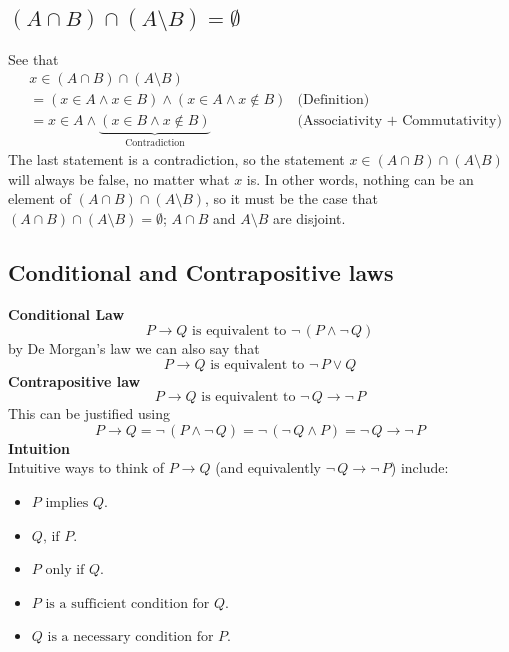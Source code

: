 \documentclass{report}
\begin{document}
\subsection{$(A\cap B)\cap(A\setminus B)=\emptyset$}
See that
\begin{align*}
&x\in(A\cap B)\cap(A\setminus B)&\\
&=(x\in A\land x\in B)\land(x\in A\land x\notin B)&\text{(Definition)}\\
&=x\in A\land\underbrace{(x\in B\land x\notin B)}_{\text{Contradiction}}&\text{(Associativity + Commutativity)}
\end{align*}
The last statement is a contradiction, so the statement 
$x\in(A\cap B)\cap(A\setminus B)$ will always be false, no matter what $x$ is. In other words, nothing can be an element of 
$(A\cap B)\cap(A\setminus B)$, so it must be the case that 
$(A\cap B)\cap(A\setminus B)=\emptyset$; $A\cap B$ and $A\setminus B$ are disjoint.
\newpage

\subsection{Conditional and Contrapositive laws}
\textbf{Conditional Law}
\begin{equation*}
P\to Q\text{ is equivalent to }\neg\,(P\land\neg\,Q)
\end{equation*}
by De Morgan's law we can also say that
\begin{equation*}
P\to Q\text{ is equivalent to }\neg\,P\lor Q
\end{equation*}
\textbf{Contrapositive law}
\begin{equation*}
P\to Q\text{ is equivalent to }\neg\,Q\to\neg\,P
\end{equation*}
This can be justified using
\begin{equation*}
P\to Q=\neg\,(P\land\neg\,Q)=\neg\,(\neg\,Q\land P)=\neg\,Q\to\neg\,P
\end{equation*}
\textbf{Intuition}\\
Intuitive ways to think of $P\to Q$ (and equivalently $\neg\,Q\to\neg\,P$) include:
\begin{itemize}
\item $P\text{ implies }Q$.
\item $Q\text{, if }P$.
\item $P\text{ only if }Q$.
\item $P\text{ is a sufficient condition for }Q$.
\item $Q\text{ is a necessary condition for }P$.
\end{itemize}
\newpage
\end{document}
